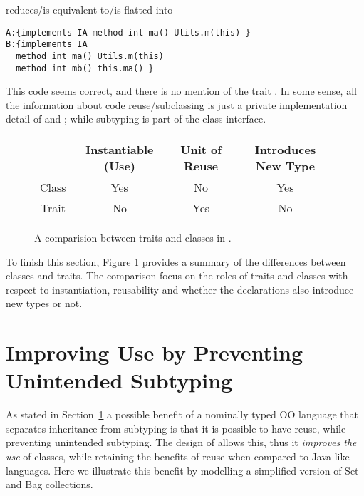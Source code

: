 \noindent reduces/is equivalent to/is flatted into
  
 \begin{lstlisting}
A:{implements IA method int ma() Utils.m(this) }
B:{implements IA
  method int ma() Utils.m(this)
  method int mb() this.ma() } 

 \end{lstlisting}
 
 This code seems correct, and there is no mention of the trait
 \Q@ta@. In some sense, all the information about code
 reuse/subclassing is just a private implementation detail of \Q@A@
 and \Q@B@; while subtyping is part of the class interface.

\begin{figure}[t]
\begin{center}
\begin{tabular}{c|c|c|c}
              & Instantiable (Use) & Unit of Reuse & Introduces New Type \\
\hline
Class  & Yes              & No          & Yes           \\
Trait   & No               & Yes         & No            \\
\end{tabular}
\end{center}
\caption{A comparision between traits and classes in \name.}
\label{fig:compare}
\end{figure}

To finish this section, Figure \ref{fig:compare} provides a summary of
the differences between classes and traits. The comparison focus on
the roles of traits and classes with respect to instantiation,
reusability and whether the declarations also introduce new types or
not.

\section{Improving Use by Preventing Unintended Subtyping}
As stated in Section~\ref{} a possible benefit of a nominally typed OO language
that separates inheritance from subtyping is that it is possible to 
have reuse, while preventing unintended subtyping. The design of \name 
allows this, thus it \emph{improves the use} of classes, while
retaining the benefits of reuse when compared to Java-like languages. 
Here we illustrate this benefit by modelling a simplified version of
Set and Bag collections. 


